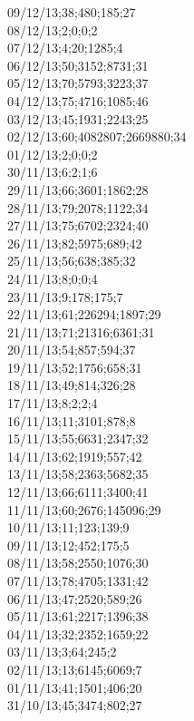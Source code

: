 09/12/13;38;480;185;27 \\
08/12/13;2;0;0;2 \\
07/12/13;4;20;1285;4 \\
06/12/13;50;3152;8731;31 \\
05/12/13;70;5793;3223;37 \\
04/12/13;75;4716;1085;46 \\
03/12/13;45;1931;2243;25 \\
02/12/13;60;4082807;2669880;34 \\
01/12/13;2;0;0;2 \\
30/11/13;6;2;1;6 \\
29/11/13;66;3601;1862;28 \\
28/11/13;79;2078;1122;34 \\
27/11/13;75;6702;2324;40 \\
26/11/13;82;5975;689;42 \\
25/11/13;56;638;385;32 \\
24/11/13;8;0;0;4 \\
23/11/13;9;178;175;7 \\
22/11/13;61;226294;1897;29 \\
21/11/13;71;21316;6361;31 \\
20/11/13;54;857;594;37 \\
19/11/13;52;1756;658;31 \\
18/11/13;49;814;326;28 \\
17/11/13;8;2;2;4 \\
16/11/13;11;3101;878;8 \\
15/11/13;55;6631;2347;32 \\
14/11/13;62;1919;557;42 \\
13/11/13;58;2363;5682;35 \\
12/11/13;66;6111;3400;41 \\
11/11/13;60;2676;145096;29 \\
10/11/13;11;123;139;9 \\
09/11/13;12;452;175;5 \\
08/11/13;58;2550;1076;30 \\
07/11/13;78;4705;1331;42 \\
06/11/13;47;2520;589;26 \\
05/11/13;61;2217;1396;38 \\
04/11/13;32;2352;1659;22 \\
03/11/13;3;64;245;2 \\
02/11/13;13;6145;6069;7 \\
01/11/13;41;1501;406;20 \\
31/10/13;45;3474;802;27 \\
